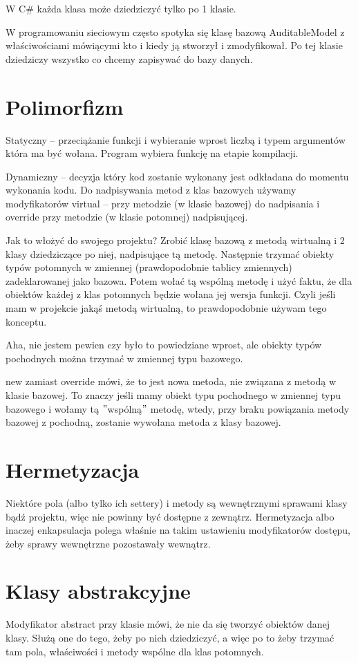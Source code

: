 \documentclass[10pt]{article}
\begin{document}
W C\# każda klasa może dziedziczyć tylko po 1 klasie.

W programowaniu sieciowym często spotyka się klasę bazową AuditableModel z właściwościami mówiącymi kto i kiedy ją stworzył i zmodyfikował. Po tej klasie dziedziczy wszystko co chcemy zapisywać do bazy danych.

\section{Polimorfizm}
Statyczny -- przeciążanie funkcji i wybieranie wprost liczbą i typem argumentów która ma być wołana. Program wybiera funkcję na etapie kompilacji.

Dynamiczny -- decyzja który kod zostanie wykonany jest odkładana do momentu wykonania kodu. Do nadpisywania metod z klas bazowych używamy modyfikatorów virtual -- przy metodzie (w klasie bazowej) do nadpisania i override przy metodzie (w klasie potomnej) nadpisującej.

Jak to włożyć do swojego projektu? Zrobić klasę bazową z metodą wirtualną i 2 klasy dziedziczące po niej, nadpisujące tą metodę. Następnie trzymać obiekty typów potomnych w zmiennej (prawdopodobnie tablicy zmiennych) zadeklarowanej jako bazowa. Potem wołać tą wspólną metodę i użyć faktu, że dla obiektów każdej z klas potomnych będzie wołana jej wersja funkcji. Czyli jeśli mam w projekcie jakąś metodą wirtualną, to prawdopodobnie używam tego konceptu.

Aha, nie jestem pewien czy było to powiedziane wprost, ale obiekty typów pochodnych można trzymać w zmiennej typu bazowego.

new zamiast override mówi, że to jest nowa metoda, nie związana z metodą w klasie bazowej. To znaczy jeśli mamy obiekt typu pochodnego w zmiennej typu bazowego i wołamy tą $"$wspólną$"$ metodę, wtedy, przy braku powiązania metody bazowej z pochodną, zostanie wywołana metoda z klasy bazowej.

\section{Hermetyzacja}
Niektóre pola (albo tylko ich settery) i metody są wewnętrznymi sprawami klasy bądź projektu, więc nie powinny być dostępne z zewnątrz. Hermetyzacja albo inaczej enkapsulacja polega właśnie na takim ustawieniu modyfikatorów dostępu, żeby sprawy wewnętrzne pozostawały wewnątrz.

\section{Klasy abstrakcyjne}
Modyfikator abstract przy klasie mówi, że nie da się tworzyć obiektów danej klasy. Służą one do tego, żeby po nich dziedziczyć, a więc po to żeby trzymać tam pola, właściwości i metody wspólne dla klas potomnych.
\end{document}
